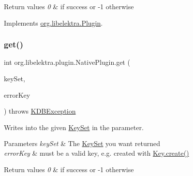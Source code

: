\begin{DoxyRetVals}{Return values}
{\em 0} & if success or -\/1 otherwise \\
\hline
\end{DoxyRetVals}


Implements \mbox{\hyperlink{interfaceorg_1_1libelektra_1_1Plugin_aa91370570c862ebe9eb83094a4731b9a}{org.\+libelektra.\+Plugin}}.

\mbox{\label{classorg_1_1libelektra_1_1plugin_1_1NativePlugin_a766870e5f26cab4d497ed7c2fbc4abd9}} 
\subsubsection{\texorpdfstring{get()}{get()}}
{\footnotesize\ttfamily int org.\+libelektra.\+plugin.\+Native\+Plugin.\+get (\begin{DoxyParamCaption}\item[{\mbox{\hyperlink{classorg_1_1libelektra_1_1KeySet}{Key\+Set}}}]{key\+Set,  }\item[{\mbox{\hyperlink{classorg_1_1libelektra_1_1Key}{Key}}}]{error\+Key }\end{DoxyParamCaption}) throws \mbox{\hyperlink{classorg_1_1libelektra_1_1exception_1_1KDBException}{K\+D\+B\+Exception}}\hspace{0.3cm}{\ttfamily [inline]}}



Writes into the given \mbox{\hyperlink{classorg_1_1libelektra_1_1KeySet}{Key\+Set}} in the parameter. 


\begin{DoxyParams}{Parameters}
{\em key\+Set} & The \mbox{\hyperlink{classorg_1_1libelektra_1_1KeySet}{Key\+Set}} you want returned \\
\hline
{\em error\+Key} & must be a valid key, e.\+g. created with \mbox{\hyperlink{classorg_1_1libelektra_1_1Key_af407cf43625618af4e7fb2576037fcfc}{Key.\+create()}} \\
\hline
\end{DoxyParams}

\begin{DoxyRetVals}{Return values}
{\em 0} & if success or -\/1 otherwise \\
\hline
\end{DoxyRetVals}


